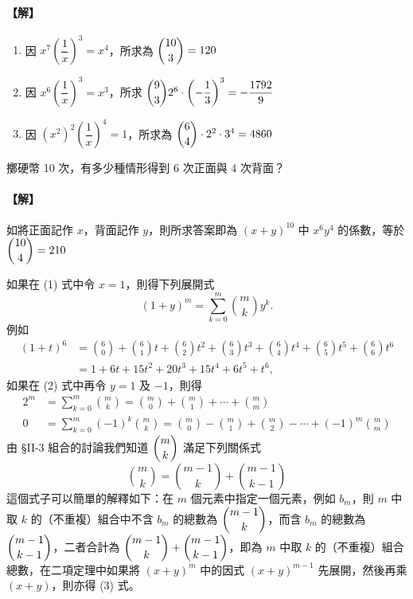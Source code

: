 \paragraph{【解】}
\begin{enumerate}[label=(\roman*)]
  \item 因 $x^7 \left(\dfrac{1}{x}\right)^3 = x^4$，所求為 $\dbinom{10}{3} = 120$
  \item 因 $x^6 \left(\dfrac{1}{x}\right)^3 = x^3$，所求 $\dbinom{9}{3} 2^6 \cdot \left(-\dfrac{1}{3}\right)^3 = -\dfrac{1792}{9}$
  \item 因 $(x^2)^2 \left(\dfrac{1}{x}\right)^4 = 1$，所求為 $\dbinom{6}{4} \cdot 2^2 \cdot 3^4 = 4860$
\end{enumerate}

\medskip
\begin{example}\label{ex:b5s-2-21}
擲硬幣 10 次，有多少種情形得到 6 次正面與 4 次背面？
\end{example}
\paragraph{【解】}
如將正面記作 $x$，背面記作 $y$，則所求答案即為 $(x + y)^{10}$ 中 $x^6 y^4$ 的係數，等於 $\dbinom{10}{4} = 210$

\bigskip
如果在 (1) 式中令 $x = 1$，則得下列展開式
\begin{equation}
(1 + y)^m = \sum_{k=0}^m \binom{m}{k} y^k. \label{eq:b5s-2-4-2}\tag{2}
\end{equation}
例如
\begin{align*}
(1 + t)^6 &= \binom{6}{0} + \binom{6}{1} t + \binom{6}{2} t^2 + \binom{6}{3} t^3 + \binom{6}{4} t^4 + \binom{6}{5} t^5 + \binom{6}{6} t^6 \\
&= 1 + 6t + 15t^2 + 20t^3 + 15t^4 + 6t^5 + t^6,
\end{align*}
如果在 (2) 式中再令 $y = 1$ 及 $-1$，則得
\begin{align*}
2^m &= \sum_{k=0}^m \binom{m}{k} = \binom{m}{0} + \binom{m}{1} + \dotsb + \binom{m}{m} \\
0 &= \sum_{k=0}^m (-1)^k \binom{m}{k} = \binom{m}{0} - \binom{m}{1} + \binom{m}{2} - \dotsb + (-1)^m \binom{m}{m}
\end{align*}
由 \S II-3 組合的討論我們知道 $\dbinom{m}{k}$ 滿足下列關係式
\begin{equation}
\binom{m}{k} = \binom{m-1}{k} + \binom{m-1}{k-1} \label{eq:b5s-2-4-3}\tag{3}
\end{equation}
這個式子可以簡單的解釋如下：在 $m$ 個元素中指定一個元素，例如 $b_m$，則 $m$ 中取 $k$ 的（不重複）組合中不含 $b_m$ 的總數為 $\dbinom{m-1}{k}$，而含 $b_m$ 的總數為 $\dbinom{m-1}{k-1}$，二者合計為 $\dbinom{m-1}{k} + \dbinom{m-1}{k-1}$，即為 $m$ 中取 $k$ 的（不重複）組合總數，在二項定理中如果將 $(x+y)^m$ 中的因式 $(x+y)^{m-1}$ 先展開，然後再乘 $(x+y)$，則亦得 (3) 式。

